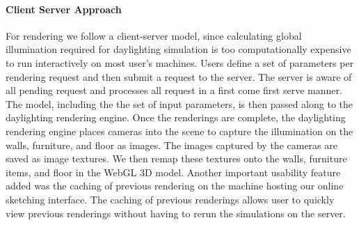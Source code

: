 	\paragraph{Client Server Approach}
	For rendering we follow a client-server model, since calculating global illumination required for daylighting simulation is too computationally expensive to run interactively on most user's machines.
	Users define a set of parameters per rendering request and then submit a request to the server.
	The server is aware of all pending request and processes all request in a first come first serve manner.
	The model, including the the set of input parameters, is then passed along to the daylighting rendering engine.
	Once the renderings are complete, the daylighting rendering engine places cameras into the scene to capture the illumination on the walls, furniture, and floor as images.
	The images captured by the cameras are saved as image textures.
	We then remap these textures onto the walls, furniture items, and floor in the WebGL 3D model.
	Another important usability feature added was the caching of previous rendering on the machine hosting our online sketching interface.
	The caching of previous renderings allows user to quickly view previous renderings without having to rerun the simulations on the server.



